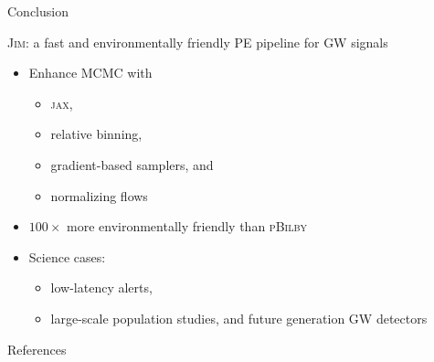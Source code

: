 \documentclass[usenames,dvipsnames,t]{beamer}
\begin{document}
\begin{frame}{Conclusion}

  \def\x{3mm}
  \def\y{2mm}

  \textsc{Jim}: a fast and environmentally friendly PE pipeline for GW signals
  
  \vspace{\y}

  \begin{itemize}
    \item Enhance MCMC with
    \begin{itemize}
      \vspace{\y}
      \item \textsc{jax},
      \vspace{\y}
      \item relative binning,
      \vspace{\y}
      \item gradient-based samplers, and
      \vspace{\y}
      \item normalizing flows
    \end{itemize}
    
    \vspace{\x}

    \item $100 \times$ more environmentally friendly than \textsc{pBilby}

    \vspace{\x}

    \item Science cases:
    \begin{itemize}
      \vspace{\y}
      \item low-latency alerts,

      \vspace{\y}

      \item large-scale population studies, and future generation GW detectors
    \end{itemize}
    
  \end{itemize}
\end{frame}

\begin{frame}{References}

\printbibliography
    
\end{frame}
\end{document}
